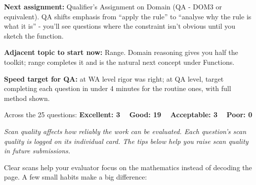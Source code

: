 \documentclass[11pt,a4paper]{article}
\begin{document}
\par\vspace{0.2cm}

\begin{tspoints}
    \item \textbf{Next assignment:} Qualifier's Assignment on Domain (QA - DOM3 or equivalent). QA shifts emphasis from ``apply the rule'' to ``analyse why the rule is what it is'' - you'll see questions where the constraint isn't obvious until you sketch the function.
    \item \textbf{Adjacent topic to start now:} Range. Domain reasoning gives you half the toolkit; range completes it and is the natural next concept under Functions.
    \item \textbf{Speed target for QA:} at WA level rigor was right; at QA level, target completing each question in under 4 minutes for the routine ones, with full method shown.
\end{tspoints}

\tsDisclaimer

\tsSignature


\newpage


Across the 25 questions: \textbf{\color{tsGreen}Excellent: 3} \ \textperiodcentered\ \textbf{\color{tsBlue}Good: 19} \ \textperiodcentered\ \textbf{\color{tsAmber}Acceptable: 3} \ \textperiodcentered\ \textbf{\color{tsRed}Poor: 0}

\par\vspace{0.1cm}
{\fontsize{9pt}{12pt}\selectfont\color{tsGrey}\textit{Scan quality affects how reliably the work can be evaluated. Each question's scan quality is logged on its individual card. The tips below help you raise scan quality in future submissions.}}


Clear scans help your evaluator focus on the mathematics instead of decoding the page. A few small habits make a big difference:
\end{document}
